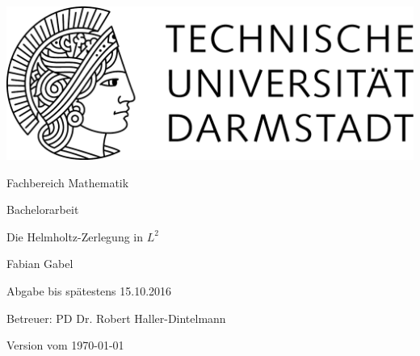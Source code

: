 \begin{titlepage}
  \begin{center}
    \vspace{1cm}
    \includegraphics[width=0.5\linewidth]{TU_Darmstadt_Logo.pdf}
    \vspace{1cm}
    
    \large{Fachbereich Mathematik}
    \vspace{2.5cm}
    
    \large{Bachelorarbeit}
    \vspace{2cm}

    \huge{Die Helmholtz-Zerlegung in $L^2$}
    
    \vspace*{3cm}    
    
		\large
                Fabian Gabel
    \vspace*{1.0cm}

    Abgabe bis spätestens 15.10.2016 \\
    \vspace*{2cm}

    Betreuer: PD Dr. Robert Haller-Dintelmann

    \vspace*{.5cm}

    \vspace*{\fill}
    \tiny{Version vom \today}
  \end{center}
\end{titlepage}
\vspace*{\fill}
